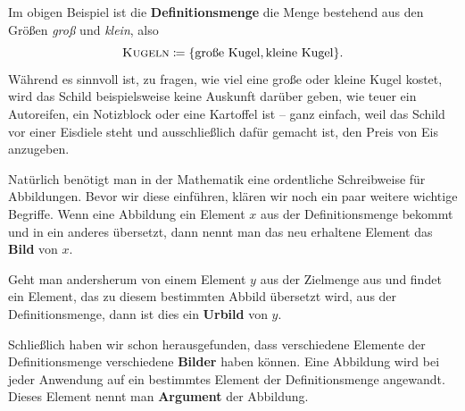 \documentclass[../../main.tex]{subfiles}
\begin{document}
\begin{example}{}
    Im obigen Beispiel ist die \textbf{Definitionsmenge} die Menge bestehend aus den Größen \emph{groß} und \emph{klein}, also 
    \[\textsc{Kugeln}\coloneqq\{\text{große Kugel},\text{kleine Kugel}\}.\]
    Während es sinnvoll ist, zu fragen, wie viel eine große oder kleine Kugel kostet, wird das Schild beispielsweise keine Auskunft darüber geben, wie teuer ein Autoreifen, ein Notizblock oder eine Kartoffel ist -- ganz einfach, weil das Schild vor einer Eisdiele steht und ausschließlich dafür gemacht ist, den Preis von Eis anzugeben.
\end{example}

Natürlich benötigt man in der Mathematik eine ordentliche Schreibweise für Abbildungen. Bevor wir diese einführen, klären wir noch ein paar weitere wichtige Begriffe. Wenn eine Abbildung ein Element $x$ aus der Definitionsmenge bekommt und in ein anderes übersetzt, dann nennt man das neu erhaltene Element das \textbf{Bild} von $x$.

Geht man andersherum von einem Element $y$ aus der Zielmenge aus und findet ein Element, das zu diesem bestimmten Abbild übersetzt wird, aus der Definitionsmenge, dann ist dies ein \textbf{Urbild} von $y$.

Schließlich haben wir schon herausgefunden, dass verschiedene Elemente der Definitionsmenge verschiedene \textbf{Bilder} haben können. Eine Abbildung wird bei jeder Anwendung auf ein bestimmtes Element der Definitionsmenge angewandt. Dieses Element nennt man \textbf{Argument} der Abbildung.
\end{document}
